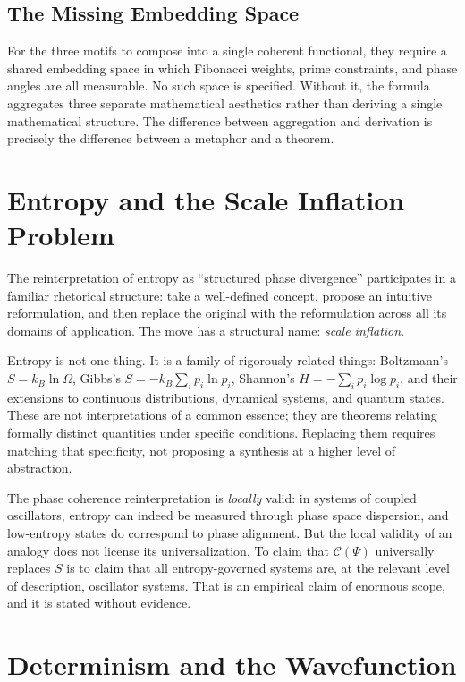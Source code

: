 \documentclass[12pt]{article}
\begin{document}
\subsection{The Missing Embedding Space}

For the three motifs to compose into a single coherent functional, they require a shared embedding space in which Fibonacci weights, prime constraints, and phase angles are all measurable. No such space is specified. Without it, the formula aggregates three separate mathematical aesthetics rather than deriving a single mathematical structure. The difference between aggregation and derivation is precisely the difference between a metaphor and a theorem.

\section{Entropy and the Scale Inflation Problem}

The reinterpretation of entropy as ``structured phase divergence'' participates in a familiar rhetorical structure: take a well-defined concept, propose an intuitive reformulation, and then replace the original with the reformulation across all its domains of application. The move has a structural name: \emph{scale inflation}.

Entropy is not one thing. It is a family of rigorously related things: Boltzmann's $S = k_B \ln \Omega$, Gibbs's $S = -k_B \sum_i p_i \ln p_i$, Shannon's $H = -\sum_i p_i \log p_i$, and their extensions to continuous distributions, dynamical systems, and quantum states. These are not interpretations of a common essence; they are theorems relating formally distinct quantities under specific conditions. Replacing them requires matching that specificity, not proposing a synthesis at a higher level of abstraction.

The phase coherence reinterpretation is \emph{locally} valid: in systems of coupled oscillators, entropy can indeed be measured through phase space dispersion, and low-entropy states do correspond to phase alignment. But the local validity of an analogy does not license its universalization. To claim that $\mathcal{C}(\Psi)$ universally replaces $S$ is to claim that all entropy-governed systems are, at the relevant level of description, oscillator systems. That is an empirical claim of enormous scope, and it is stated without evidence.

\section{Determinism and the Wavefunction}
\end{document}
